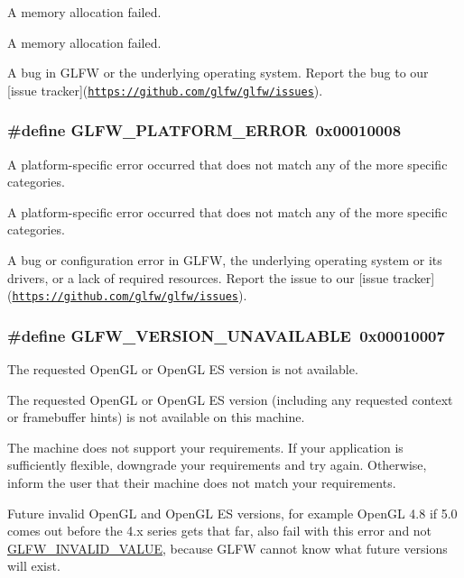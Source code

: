 A memory allocation failed. 

A memory allocation failed.

A bug in GLFW or the underlying operating system. Report the bug to our \mbox{[}issue tracker\mbox{]}(\href{https://github.com/glfw/glfw/issues}{\tt https://github.com/glfw/glfw/issues}). \hypertarget{group__errors_gd44162d78100ea5e87cdd38426b8c7a1}{
\subsubsection[GLFW\_\-PLATFORM\_\-ERROR]{\setlength{\rightskip}{0pt plus 5cm}\#define GLFW\_\-PLATFORM\_\-ERROR~0x00010008}}
\label{group__errors_gd44162d78100ea5e87cdd38426b8c7a1}


A platform-specific error occurred that does not match any of the more specific categories. 

A platform-specific error occurred that does not match any of the more specific categories.

A bug or configuration error in GLFW, the underlying operating system or its drivers, or a lack of required resources. Report the issue to our \mbox{[}issue tracker\mbox{]}(\href{https://github.com/glfw/glfw/issues}{\tt https://github.com/glfw/glfw/issues}). \hypertarget{group__errors_gd16c5565b4a69f9c2a9ac2c0dbc89462}{
\subsubsection[GLFW\_\-VERSION\_\-UNAVAILABLE]{\setlength{\rightskip}{0pt plus 5cm}\#define GLFW\_\-VERSION\_\-UNAVAILABLE~0x00010007}}
\label{group__errors_gd16c5565b4a69f9c2a9ac2c0dbc89462}


The requested OpenGL or OpenGL ES version is not available. 

The requested OpenGL or OpenGL ES version (including any requested context or framebuffer hints) is not available on this machine.

The machine does not support your requirements. If your application is sufficiently flexible, downgrade your requirements and try again. Otherwise, inform the user that their machine does not match your requirements.

\begin{Desc}
\item[]Future invalid OpenGL and OpenGL ES versions, for example OpenGL 4.8 if 5.0 comes out before the 4.x series gets that far, also fail with this error and not \hyperlink{group__errors_gaf2ef9aa8202c2b82ac2d921e554c687}{GLFW\_\-INVALID\_\-VALUE}, because GLFW cannot know what future versions will exist. \end{Desc}
